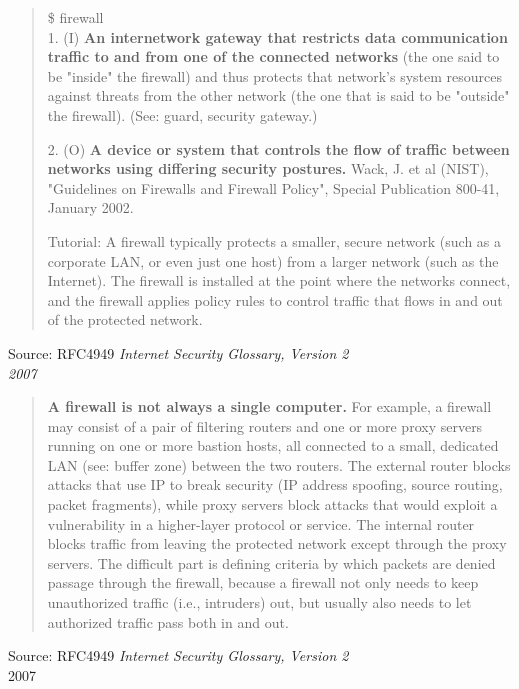 \documentclass[Screen16to9,17pt]{foils}
\begin{document}

\begin{quote}\small
\$ firewall\\

1. (I) {\bf An internetwork gateway that restricts data communication traffic to and from one of the connected networks} (the one said to be "inside" the firewall) and thus protects that network's system resources against threats from the other network (the one that is said to be "outside" the firewall). (See: guard, security gateway.)

2. (O) {\bf A device or system that controls the flow of traffic between networks using differing security postures.} Wack, J. et al (NIST), "Guidelines on Firewalls and Firewall Policy", Special Publication 800-41, January 2002.

Tutorial: A firewall typically protects a smaller, secure network (such as a corporate LAN, or even just one host) from a larger network (such as the Internet). The firewall is installed at the point where the networks connect, and the firewall applies policy rules to control traffic that flows in and out of the protected network.
\end{quote}
Source: RFC4949 \emph{Internet Security Glossary, Version 2\\
 2007}

\begin{quote}\small
{\bf A firewall is not always a single computer.} For example, a firewall may consist of a pair of filtering routers and one or more proxy servers running on one or more bastion hosts, all connected to a small, dedicated LAN (see: buffer zone) between the two routers. The external router blocks attacks that use IP to break security (IP address spoofing, source routing, packet fragments), while proxy servers block attacks that would exploit a vulnerability in a higher-layer protocol or service. The internal router blocks traffic from leaving the protected network except through the proxy servers. The difficult part is defining criteria by which packets are denied passage through the firewall, because a firewall not only needs to keep unauthorized traffic (i.e., intruders) out, but usually also needs to let authorized traffic pass both in and out.
\end{quote}
{\footnotesize Source: RFC4949 \emph{Internet Security Glossary, Version 2}\\
 2007}
\end{document}
